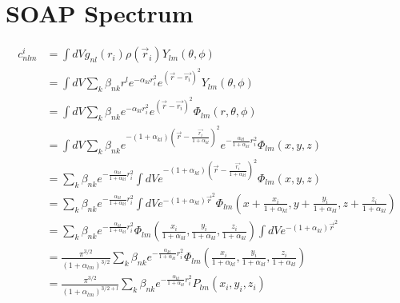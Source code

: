 \documentclass[10pt]{article}
\begin{document}
\maketitle

\section*{SOAP Spectrum}

\begin{align}
c^i_{nlm} &= \int dV g_{nl} (r_i) \rho(\vec{r}_i) Y_{lm}(\theta, \phi) \\
          &= \int dV \sum_k \beta_{nk} r^l e^{-\alpha_{kl} r_i^2}  e^{(\vec{r} - \vec{r_i})^2} Y_{lm}(\theta, \phi) \\
          &= \int dV \sum_k \beta_{nk} e^{-\alpha_{kl} r_i^2}  e^{(\vec{r} - \vec{r_i})^2} \Phi_{lm}(r, \theta, \phi) \\
          &= \int dV \sum_k \beta_{nk} e^{- (1+\alpha_{kl})(\vec{r} - \frac{\vec{r_i}}{1+\alpha_{kl}})^2} e^{-\frac{\alpha_{kl} }{1+\alpha_{kl}} r^2_i} \Phi_{lm}(x, y, z) \\
          &=  \sum_k \beta_{nk} e^{-\frac{\alpha_{kl}}{1+\alpha_{kl}} r^2_i} \int dV  e^{- (1+\alpha_{kl})(\vec{r} - \frac{\vec{r_i}}{1+\alpha_{kl}})^2}  \Phi_{lm}(x, y, z) \\
          &=  \sum_k \beta_{nk} e^{-\frac{\alpha_{kl}}{1+\alpha_{kl}} r^2_i} \int dV  e^{- (1+\alpha_{kl})\vec{r} ^2}  \Phi_{lm}(x+\frac{x_i}{1+\alpha_{kl}}, y +\frac{y_i}{1+\alpha_{kl}}, z+\frac{z_i}{1+\alpha_{kl}}) \label{infinity} \\
          &=  \sum_k \beta_{nk} e^{-\frac{\alpha_{kl}}{1+\alpha_{kl}} r^2_i} \Phi_{lm}(\frac{x_i}{1+\alpha_{kl}}, \frac{y_i}{1+\alpha_{kl}}, \frac{z_i}{1+\alpha_{kl}}) \int dV  e^{- (1+\alpha_{kl})\vec{r} ^2}   \\
          &=  \frac{\pi^{3/2}}{(1+\alpha_{lm})^{3/2}}\sum_k \beta_{nk} e^{-\frac{\alpha_{kl}}{1+\alpha_{kl}} r^2_i} \Phi_{lm}(\frac{x_i}{1+\alpha_{kl}}, \frac{y_i}{1+\alpha_{kl}}, \frac{z_i}{1+\alpha_{kl}}) \\
          &=  \frac{\pi^{3/2}}{(1+\alpha_{lm})^{3/2 + l}}\sum_k \beta_{nk} e^{-\frac{\alpha_{kl}}{1+\alpha_{kl}} r^2_i} P_{lm}(x_i, y_i, z_i)  \label{harpoly}
\end{align}
\end{document}
